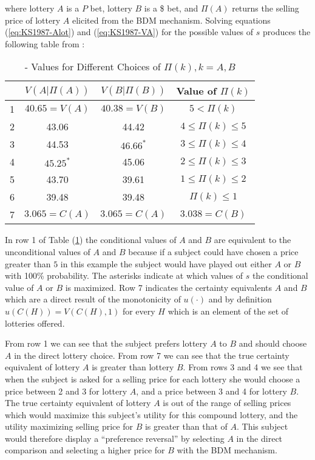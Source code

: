 \documentclass[../main.tex]{subfiles}
\begin{document}
\noindent where lottery $A$ is a $P$ bet, lottery $B$ is a {\$} bet, and $\Pi(A)$ returns the selling price of lottery $A$ elicited from the BDM mechanism.
Solving equations (\ref{eq:KS1987-Alot}) and (\ref{eq:KS1987-VA}) for the possible values of $s$ produces the following table from \textcite[679]{Karni1987}:
\begin{table}[ht]
	\centering
	\caption{ \textcite{Karni1987} - Values for Different Choices of $\Pi(k),k = A,B$}
	\label{tb:KS1987:Pi}
	\begin{tabular}{cccc}
		   & $V(A|\Pi(A))$  & $V(B|\Pi(B))$  & Value of $\Pi(k)$      \\\hline
		1  & $40.65 = V(A)$ & $40.38 = V(B)$ & $5 < \Pi(k)$           \\
		2  & 43.06          & 44.42          & $4 \leq \Pi(k) \leq 5$ \\
		3  & 44.53          & $46.66^*$      & $3 \leq \Pi(k) \leq 4$ \\
		4  & $45.25^*$      & 45.06          & $2 \leq \Pi(k) \leq 3$ \\
		5  & 43.70          & 39.61          & $1 \leq \Pi(k) \leq 2$ \\
		6  & 39.48          & 39.48          & $\Pi(k) \leq 1$        \\\hline
		7  & $3.065 = C(A)$ & $3.065 = C(A)$ & $3.038 = C(B)$
	\end{tabular}
\end{table}

In row 1 of Table (\ref{tb:KS1987:Pi}) the conditional values of $A$ and $B$ are equivalent to the unconditional values of $A$ and $B$ because if a subject could have chosen a price greater than $5$ in this example the subject would have played out either $A$ or $B$ with 100\% probability.
The asterisks indicate at which values of $s$ the conditional value of $A$ or $B$ is maximized.
Row 7 indicates the certainty equivalents $A$ and $B$ which are a direct result of the monotonicity of $u(\cdot)$ and by definition $u(C(H)) = V(C(H),1)$ for every $H$ which is an element of the set of lotteries offered. 

From row 1 we can see that the subject prefers lottery $A$ to $B$ and should choose $A$ in the direct lottery choice.
From row 7 we can see that the true certainty equivalent of lottery $A$ is greater than lottery $B$.
From rows 3 and 4 we see that when the subject is asked for a selling price for each lottery she would choose a price between 2 and 3 for lottery $A$, and a price between 3 and 4 for lottery $B$.
The true certainty equivalent of lottery $A$ is out of the range of selling prices which would maximize this subject's utility for this compound lottery, and the utility maximizing selling price for $B$ is greater than that of $A$.
This subject would therefore display a \enquote{preference reversal} by selecting $A$ in the direct comparison and selecting a higher price for $B$ with the BDM mechanism.
\end{document}
